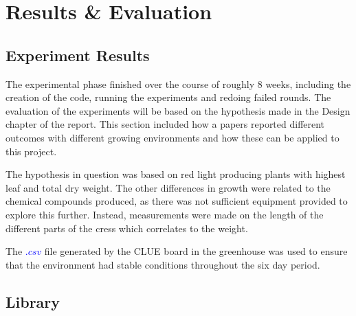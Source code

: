 \chapter{Results \& Evaluation}

\section{Experiment Results}

The experimental phase finished over the course of roughly 8 weeks, including the creation of the code, running the experiments and redoing failed rounds. The evaluation of the experiments will be based on the hypothesis made in the Design chapter of the report. This section included how a papers reported different outcomes with different growing environments and how these can be applied to this project.

The hypothesis in question was based on red light producing plants with highest leaf and total dry weight. The other differences in growth were related to the chemical compounds produced, as there was not sufficient equipment provided to explore this further. Instead, measurements were made on the length of the different parts of the cress which correlates to the weight.

The \textcolor{blue}{$.csv$} file generated by the CLUE board in the greenhouse was used to ensure that the environment had stable conditions throughout the six day period. 
                              

\section{Library}   

